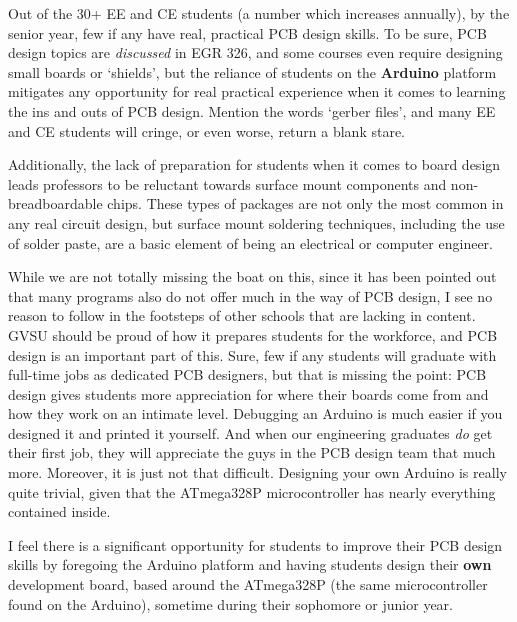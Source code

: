 \documentclass[12pt]{article}
\numberwithin{figure}{section}
\numberwithin{equation}{section}
\begin{document}
{\bigskip

Out of the 30+ EE and CE students (a number which increases annually), by
the senior year, few if any have real, practical PCB design skills. To
be sure, PCB design topics are \emph{discussed} in EGR 326, and some
courses even require designing small boards or `shields', but the
reliance of students on the \textbf{Arduino} platform mitigates any
opportunity for real practical experience when it comes to learning the
ins and outs of PCB design. Mention the words `gerber files', and many
EE and CE students will cringe, or even worse, return a blank stare.

\bigskip

Additionally, the lack of preparation for students when it comes to
board design leads professors to be reluctant towards surface mount
components and non-breadboardable chips. These types of packages are not
only the most common in any real circuit design, but surface mount
soldering techniques, including the use of solder paste, are a basic
element of being an electrical or computer engineer.

\bigskip

While we are not totally missing the boat on this, since it has been pointed out that many programs also do not offer much in the way of PCB design, I see no reason to follow in the footsteps of other schools that are lacking in content. GVSU should be proud of how it prepares students for the workforce, and PCB design is an important part of this. Sure, few if any students will graduate with full-time jobs as dedicated PCB designers, but that is missing the point: PCB design gives students more appreciation for where their boards come from and how they work on an intimate level. Debugging an Arduino is much easier if you designed it and printed it yourself. And when our engineering graduates \emph{do} get their first job, they will appreciate the guys in the PCB design team that much more. Moreover, it is just not that difficult. Designing your own Arduino is really quite trivial, given that the ATmega328P microcontroller has nearly everything contained inside.

\bigskip

I feel there is a significant opportunity for students to improve their
PCB design skills by foregoing the Arduino platform and having students
design their \textbf{own} development board, based around the ATmega328P
(the same microcontroller found on the Arduino), sometime during their
sophomore or junior year.

}
\end{document}
